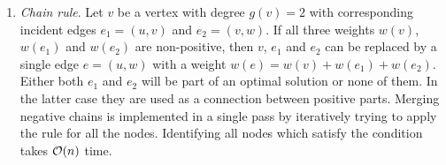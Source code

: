 \begin{enumerate}\addtocounter{enumi}{3}
	\item \textit{Chain rule}. Let $v$ be a vertex with degree $g(v) = 2$ with corresponding incident edges $e_1 = (u, v)$ and $e_2 = (v,w)$. If all three weights $w(v)$, $w(e_1)$ and $w(e_2)$ are non-positive, then $v$, $e_1$ and $e_2$ can be replaced by a single edge $e = (u, w)$ with a weight $w(e) = w(v) + w(e_1) + w(e_2)$. Either both $e_1$ and $e_2$ will be part of an optimal solution or none of them. In the latter case they are used as a connection between positive parts. Merging negative chains is implemented in a single pass by iteratively trying to apply the rule for all the nodes. Identifying all nodes which satisfy the condition takes $\mathcal{O}(n)$ time.
\end{enumerate}

